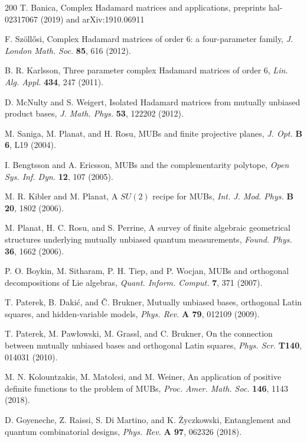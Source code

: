 \documentclass[english,aps,pra,nofootinbib,twocolumn,superscriptaddress]{revtex4-1}
\newcommand{\1}{{\rm 1\hspace{-0.9mm}l}}
\begin{document}
\begin{thebibliography}{200}
  T. Banica,
 Complex Hadamard matrices and applications,
  preprints hal-02317067 (2019)
   and	arXiv:1910.06911
 
     F. Sz{\"o}ll{\H o}si,
Complex Hadamard matrices of order $6$: a four-parameter family, 
{\sl J. London Math. Soc.} {\bf 85}, 616 (2012).

  B. R. Karlsson,
 Three parameter complex Hadamard matrices of order $6$,
{\sl  Lin. Alg. Appl.} {\bf  434}, 247 (2011). 

 D. McNulty and S. Weigert,
Isolated Hadamard matrices from mutually unbiased product bases,  
{\sl J. Math. Phys.} {\bf  53}, 122202 (2012). 

 M. Saniga, M. Planat, and H. Rosu, 
MUBs and finite projective planes, 
{\sl J. Opt.} {\bf B 6}, L19 (2004).

 I. Bengtsson and A. Ericsson, 
MUBs and the complementarity polytope,
{\sl Open Sys. Inf. Dyn.} {\bf 12}, 107 (2005).

 M. R. Kibler and M. Planat, 
A $SU(2)$ recipe for MUBs,
{\sl  Int. J. Mod. Phys.} {\bf  B 20}, 1802 (2006).

 M. Planat, H. C. Rosu, and S. Perrine,  
A survey of finite algebraic geometrical structures 
underlying mutually unbiased quantum measurements,
{\sl Found. Phys.} {\bf  36}, 1662 (2006).

P. O. Boykin, M. Sitharam, P. H. Tiep, and P. Wocjan, 
MUBs and orthogonal decompositions of Lie algebras,
{\sl Quant. Inform. Comput.} {\bf 7}, 371 (2007).

 T. Paterek, B. Daki{\'c}, and {\v C}. Brukner,
  Mutually unbiased bases, orthogonal Latin squares, and hidden-variable models,
       {\sl Phys. Rev.} {\bf A 79}, 012109  (2009).

 T. Paterek, M. Paw{\l}owski, M. Grassl, and C. Brukner,
On the connection between mutually unbiased bases and orthogonal Latin squares,
{\sl Phys. Scr.} {\bf  T140}, 014031 (2010).

 M. N. Kolountzakis, M. Matolcsi, and M. Weiner,
An application of positive definite functions to the problem of MUBs, 
{\sl Proc. Amer. Math. Soc.} {\bf  146}, 1143 (2018).


 D. Goyeneche, Z. Raissi, S. Di Martino, and K. {\.Z}yczkowski,
    Entanglement and quantum combinatorial designs,
{\sl Phys. Rev.} {\bf A 97}, 062326 (2018).


\end{thebibliography}
\end{document}
